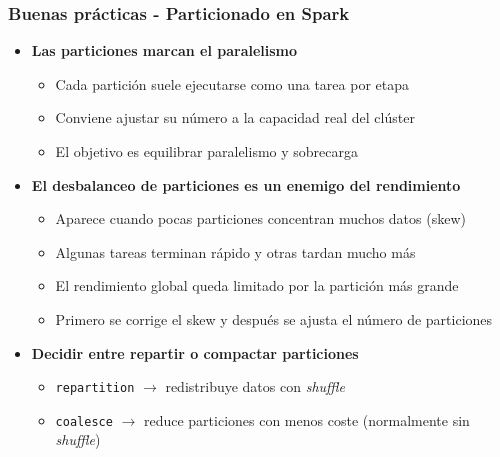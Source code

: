 \documentclass[aspectratio=169]{beamer}
\begin{document}
\begin{frame}\frametitle{Buenas prácticas - Particionado en Spark}
\begin{itemize}
  \item \textbf{Las particiones marcan el paralelismo}
  \begin{itemize}
    \item Cada partición suele ejecutarse como una tarea por etapa
    \item Conviene ajustar su número a la capacidad real del clúster
    \item El objetivo es equilibrar paralelismo y sobrecarga
  \end{itemize}

  \vspace{0.8em}

  \item \textbf{El desbalanceo de particiones es un enemigo del rendimiento}
  \begin{itemize}
    \item Aparece cuando pocas particiones concentran muchos datos (skew)
    \item Algunas tareas terminan rápido y otras tardan mucho más
    \item El rendimiento global queda limitado por la partición más grande
    \item Primero se corrige el skew y después se ajusta el número de particiones
  \end{itemize}

  \vspace{0.8em}

  \item \textbf{Decidir entre repartir o compactar particiones}
  \begin{itemize}
    \item \texttt{repartition} $\rightarrow$ redistribuye datos con \textit{shuffle}
    \item \texttt{coalesce} $\rightarrow$ reduce particiones con menos coste (normalmente sin \textit{shuffle})
  \end{itemize}
\end{itemize}
\end{frame}
\end{document}
